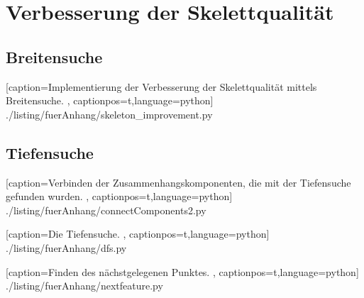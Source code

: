 \section{Verbesserung der Skelettqualität}
\subsection{Breitensuche}
 
    [caption={Implementierung der Verbesserung der Skelettqualität mittels Breitensuche.}
       \label{lst:breitensuche},
       captionpos=t,language=python]
 {./listing/fuerAnhang/skeleton_improvement.py}
 \newpage
\subsection{Tiefensuche}

    [caption={Verbinden der Zusammenhangskomponenten, die mit der Tiefensuche gefunden wurden.}
       \label{lst:connectcomponents},
       captionpos=t,language=python]
 {./listing/fuerAnhang/connectComponents2.py}
 
 
     [caption={Die Tiefensuche.}
        \label{lst:tiefensuche},
        captionpos=t,language=python]
  {./listing/fuerAnhang/dfs.py}
  
 
      [caption={Finden des nächstgelegenen Punktes.}
         \label{lst:findnextfeature},
         captionpos=t,language=python]
   {./listing/fuerAnhang/nextfeature.py}
